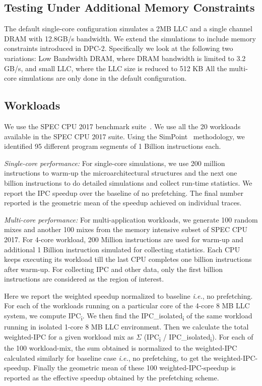 \subsection{Testing Under Additional Memory Constraints}
\label{Method-AdditionalMem}
The default single-core configuration simulates a 2MB LLC and a single channel
DRAM with 12.8GB/s bandwidth.  We extend the simulations to include memory
constraints introduced in DPC-2.  Specifically we look at the following two
variations: Low Bandwidth DRAM, where DRAM bandwidth is limited to 3.2 GB/s,
and small LLC, where the LLC size is reduced to 512 KB All the multi-core
simulations are only done in the default configuration.

\subsection{Workloads}
\label{Method-Workloads}

We use the SPEC CPU 2017 benchmark suite~\cite{SPEC2017}.  We use all the 20
workloads available in the SPEC CPU 2017 suite.  Using the SimPoint~\cite{SimPoint}
methodology, we identified 95 different program segments of 1 Billion
instructions each.

\textit{Single-core performance:} For single-core simulations, we use 200
million instructions to warm-up the microarchitectural structures and the next
one billion instructions to do detailed simulations and collect run-time
statistics. We report the IPC speedup over the baseline of no prefetching.
The final number reported is the geometric mean of the speedup achieved on
individual traces.

\textit{Multi-core performance:} For multi-application workloads, we generate
100 random mixes and another 100 mixes from the memory intensive subset of
SPEC CPU 2017.  For 4-core workload, 200 Million instructions are used for warm-up
and additional 1 Billion instruction simulated for collecting statistics.
Each CPU keeps executing its workload till the last CPU completes one billion
instructions after warm-up.  For collecting IPC and other data, only the first
billion instructions are considered as the region of interest.

Here we report the weighted speedup normalized to baseline
\textit{i.e.}, no prefetching.  For each of the workloads running on a
particular core of the 4-core 8 MB LLC system, we compute
IPC\textsubscript{i}.  We then find the IPC\_isolated\textsubscript{i}
of the same workload running in isolated 1-core 8 MB LLC environment.
Then we calculate the total weighted-IPC for a given workload mix as
$\Sigma$ (IPC\textsubscript{i} / IPC\_isolated\textsubscript{i}).  For
each of the 100 workload-mix, the sum obtained is normalized to the
weighted-IPC calculated similarly for baseline case \textit{i.e.}, no
prefetching, to get the weighted-IPC-speedup.  Finally the geometric
mean of these 100 weighted-IPC-speedup is reported as the effective
speedup obtained by the prefetching scheme.

